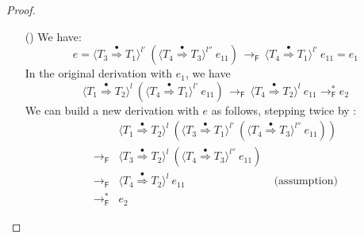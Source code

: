 \documentclass[9pt]{extarticle}
\newcommand{\ottnt}[1]{\mathit{#1}}
\begin{document}
{\begin{lemma}
\begin{proof}
{\begin{itemize}
    \item[(\E{CastMerge})] We have: \[ \ottnt{e} =  \langle  \ottnt{T_{{\mathrm{3}}}}  \mathord{ \overset{\bullet}{\Rightarrow} }  \ottnt{T_{{\mathrm{1}}}}  \rangle^{ \ottnt{l'} } ~   (  \langle  \ottnt{T_{{\mathrm{4}}}}  \mathord{ \overset{\bullet}{\Rightarrow} }  \ottnt{T_{{\mathrm{3}}}}  \rangle^{ \ottnt{l''} } ~  \ottnt{e_{{\mathrm{11}}}}  )   \,  \longrightarrow _{  \mathsf{F}  }  \,  \langle  \ottnt{T_{{\mathrm{4}}}}  \mathord{ \overset{\bullet}{\Rightarrow} }  \ottnt{T_{{\mathrm{1}}}}  \rangle^{ \ottnt{l'} } ~  \ottnt{e_{{\mathrm{11}}}}  = \ottnt{e_{{\mathrm{1}}}} \]
In the original derivation with $\ottnt{e_{{\mathrm{1}}}}$, we have \[  \langle  \ottnt{T_{{\mathrm{1}}}}  \mathord{ \overset{\bullet}{\Rightarrow} }  \ottnt{T_{{\mathrm{2}}}}  \rangle^{ \ottnt{l} } ~   (  \langle  \ottnt{T_{{\mathrm{4}}}}  \mathord{ \overset{\bullet}{\Rightarrow} }  \ottnt{T_{{\mathrm{1}}}}  \rangle^{ \ottnt{l'} } ~  \ottnt{e_{{\mathrm{11}}}}  )   \,  \longrightarrow _{  \mathsf{F}  }  \,  \langle  \ottnt{T_{{\mathrm{4}}}}  \mathord{ \overset{\bullet}{\Rightarrow} }  \ottnt{T_{{\mathrm{2}}}}  \rangle^{ \ottnt{l} } ~  \ottnt{e_{{\mathrm{11}}}}   \longrightarrow ^{*}_{  \mathsf{F}  }  \ottnt{e_{{\mathrm{2}}}} \] We can
      build a new derivation with $\ottnt{e}$ as follows, stepping twice by :
      \[ \begin{array}{rl}
        &  \langle  \ottnt{T_{{\mathrm{1}}}}  \mathord{ \overset{\bullet}{\Rightarrow} }  \ottnt{T_{{\mathrm{2}}}}  \rangle^{ \ottnt{l} } ~   (  \langle  \ottnt{T_{{\mathrm{3}}}}  \mathord{ \overset{\bullet}{\Rightarrow} }  \ottnt{T_{{\mathrm{1}}}}  \rangle^{ \ottnt{l'} } ~   (  \langle  \ottnt{T_{{\mathrm{4}}}}  \mathord{ \overset{\bullet}{\Rightarrow} }  \ottnt{T_{{\mathrm{3}}}}  \rangle^{ \ottnt{l''} } ~  \ottnt{e_{{\mathrm{11}}}}  )   )    \\
         \longrightarrow _{  \mathsf{F}  } &  \langle  \ottnt{T_{{\mathrm{3}}}}  \mathord{ \overset{\bullet}{\Rightarrow} }  \ottnt{T_{{\mathrm{2}}}}  \rangle^{ \ottnt{l} } ~   (  \langle  \ottnt{T_{{\mathrm{4}}}}  \mathord{ \overset{\bullet}{\Rightarrow} }  \ottnt{T_{{\mathrm{3}}}}  \rangle^{ \ottnt{l''} } ~  \ottnt{e_{{\mathrm{11}}}}  )    \\
         \longrightarrow _{  \mathsf{F}  } &  \langle  \ottnt{T_{{\mathrm{4}}}}  \mathord{ \overset{\bullet}{\Rightarrow} }  \ottnt{T_{{\mathrm{2}}}}  \rangle^{ \ottnt{l} } ~  \ottnt{e_{{\mathrm{11}}}}  \qquad\qquad\qquad\qquad \text{(assumption)} \\
         \longrightarrow ^{*}_{  \mathsf{F}  } & \ottnt{e_{{\mathrm{2}}}} 
      \end{array} \]
    \end{itemize}

}
\end{proof}
\end{lemma}}
\end{document}
